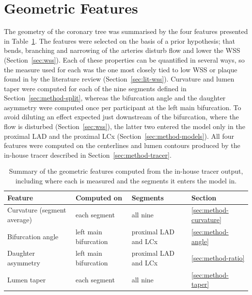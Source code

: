\section{Geometric Features}
\label{sec:method-features}

The geometry of the coronary tree was summarised by the four features presented in Table~\ref{tab:method-features}.
The features were selected on the basis of a prior hypothesis; that bends, branching and narrowing of the arteries disturb flow and lower the WSS (Section~\ref{sec:wss}).
Each of these properties can be quantified in several ways, so the measure used for each was the one most closely tied to low WSS or plaque found in by the literature review (Section~\ref{sec:lit-wss}).
Curvature and lumen taper were computed for each of the nine segments defined in Section~\ref{sec:method-split}, whereas the bifurcation angle and the daughter asymmetry were computed once per participant at the left main bifurcation.
To avoid diluting an effect expected just downstream of the bifurcation, where the flow is disturbed (Section~\ref{sec:wss}), the latter two entered the model only in the proximal LAD and the proximal LCx (Section~\ref{sec:method-models}).
All four features were computed on the centerlines and lumen contours produced by the in-house tracer described in Section~\ref{sec:method-tracer}.

\begin{table}[htbp]
  \centering
  \caption{Summary of the geometric features computed from the in-house tracer output, including where each is measured and the segments it enters the model in.}
  \label{tab:method-features}
  \begin{tabular}{llll}
    \toprule
    Feature & Computed on & Segments & Section \\
    \midrule
    Curvature (segment average) & each segment & all nine & \ref{sec:method-curvature} \\
    Bifurcation angle & left main bifurcation & proximal LAD and LCx & \ref{sec:method-angle} \\
    Daughter asymmetry & left main bifurcation & proximal LAD and LCx & \ref{sec:method-ratio} \\
    Lumen taper & each segment & all nine & \ref{sec:method-taper} \\
    \bottomrule
  \end{tabular}
\end{table}





